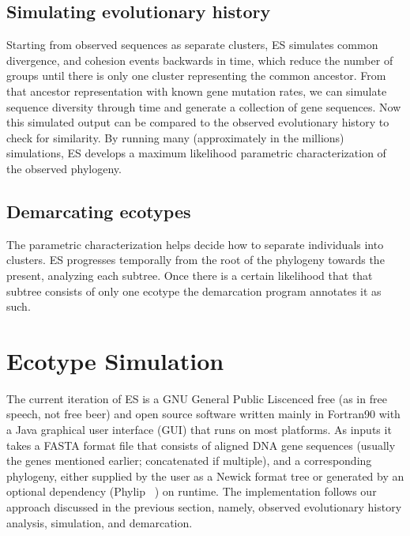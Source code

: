 \subsection*{Simulating evolutionary history}
Starting from observed sequences as separate clusters, ES simulates common divergence, and cohesion events backwards in time, which reduce the number of groups until there is only one cluster representing the common ancestor.
From that ancestor representation with known gene mutation rates, we can simulate sequence diversity through time and generate a collection of gene sequences.
Now this simulated output can be compared to the observed evolutionary history to check for similarity.
By running many (approximately in the millions) simulations, ES develops a maximum likelihood parametric characterization of the observed phylogeny. 

\subsection*{Demarcating ecotypes}
The parametric characterization helps decide how to separate individuals into clusters.
ES progresses temporally from the root of the phylogeny towards the present, analyzing each subtree.
Once there is a certain likelihood that that subtree consists of only one ecotype the demarcation program annotates it as such.


\section{Ecotype Simulation}
%
%
The current iteration of ES is a GNU General Public Liscenced free (as in free speech, not free beer) and open source software written mainly in Fortran90 with a Java graphical user interface (GUI) that runs on most platforms.
As inputs it takes a FASTA format file that consists of aligned DNA gene sequences (usually the genes mentioned earlier; concatenated if multiple), and a corresponding phylogeny, either supplied by the user as a Newick format tree or generated by an optional dependency (Phylip ~\cite{felsenstein1989phylip}) on runtime.
The implementation follows our approach discussed in the previous section, namely, observed evolutionary history analysis, simulation, and demarcation.

